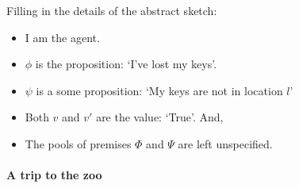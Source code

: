 \begin{note}
  Filling in the details of the abstract sketch:
  \begin{itemize}[noitemsep]
  \item
    I am the agent.
  \item
    \(\phi\) is the proposition: `I've lost my keys'.
  \item
    \(\psi\) is a some proposition: `My keys are not in location \(l\)'
  \item
    Both \(v\) and \(v'\) are the value: `True'.
    And,
  \item
    The pools of premises \(\Phi\) and \(\Psi\) are left unspecified.
  \end{itemize}
\end{note}

\paragraph{A trip to the zoo}

